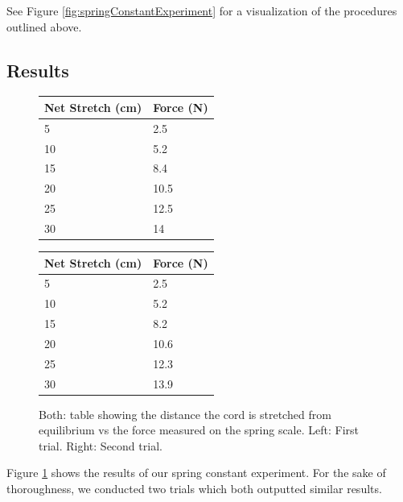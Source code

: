 \documentclass[12pt]{article}
\begin{document}
See Figure \ref{fig:springConstantExperiment} for a visualization of the procedures outlined above.

\subsection{Results}

\begin{figure}[h]
\centering
\begin{tabular}{l|l}
Net Stretch (cm) & Force (N) \\ \hline
5                & 2.5                 \\
\rowcolor[HTML]{EFEFEF} 
10               & 5.2                 \\
15               & 8.4                 \\
\rowcolor[HTML]{EFEFEF} 
20               & 10.5                \\
25               & 12.5                \\
\rowcolor[HTML]{EFEFEF} 
30               & 14               
\end{tabular}
\begin{tabular}{l|l}
Net Stretch (cm) & Force (N) \\ \hline
5               & 2.5                 \\
\rowcolor[HTML]{EFEFEF} 
10               & 5.2                \\
15               & 8.2                \\
\rowcolor[HTML]{EFEFEF} 
20               & 10.6                \\
25               & 12.3                \\
\rowcolor[HTML]{EFEFEF} 
30               & 13.9               
\end{tabular}
\caption{Both: table showing the distance the cord is stretched from equilibrium vs the force measured on the spring scale. Left: First trial. Right: Second trial.}
\label{fig:springConstantTables}
\end{figure}

Figure \ref{fig:springConstantTables} shows the results of our spring constant experiment. For the sake of thoroughness, we conducted two trials which both outputted similar results.
\end{document}
